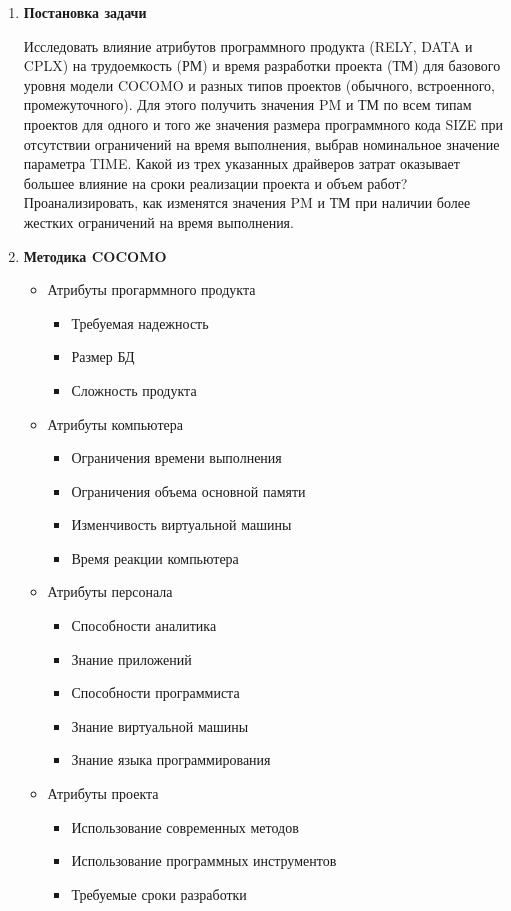 \documentclass[a4paper,14pt]{extreport} %
\begin{document}
\begin{enumerate}

\item \textbf{Постановка задачи}

Исследовать влияние атрибутов программного продукта (RELY, DATA и CPLX) на трудоемкость (РМ) и время разработки проекта (ТМ) для базового уровня модели COCOMO и разных типов проектов (обычного, встроенного, промежуточного). Для этого получить значения PM и ТМ по всем типам проектов для одного и того же значения размера программного кода SIZE при отсутствии ограничений на время выполнения, выбрав номинальное значение параметра TIME. Какой из трех указанных драйверов затрат оказывает большее влияние на сроки реализации проекта и объем работ? Проанализировать, как изменятся значения PM и ТМ при наличии более жестких ограничений на время выполнения.

\item \textbf{Методика COCOMO}
\begin{itemize}
\item Атрибуты прогарммного продукта
\begin{itemize}
\item Требуемая надежность
\item Размер БД 
\item Сложность продукта
\end{itemize}
\item Атрибуты компьютера
\begin{itemize}
\item Ограничения времени выполнения
\item Ограничения объема основной памяти
\item Изменчивость виртуальной машины 
\item Время реакции компьютера
\end{itemize}
\item Атрибуты персонала
\begin{itemize}
\item Способности аналитика
\item Знание приложений
\item Способности программиста
\item Знание виртуальной машины
\item Знание языка программирования
\end{itemize}
\item Атрибуты проекта
\begin{itemize}
\item Использование современных методов
\item Использование программных инструментов
\item Требуемые сроки разработки
\end{itemize}
\end{itemize}


\end{enumerate}
\end{document}
